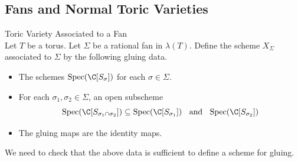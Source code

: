 \documentclass[a4paper]{article}
\begin{document}
\subsection{Fans and Normal Toric Varieties}
\begin{defn}{Toric Variety Associated to a Fan}{}\\
Let $T$ be a torus. Let $\Sigma$ be a rational fan in $\lambda(T)$. Define the scheme $X_\Sigma$ associated to $\Sigma$ by the following gluing data. 
\begin{itemize}
\item The schemes $\text{Spec}(\C[S_\sigma])$ for each $\sigma\in\Sigma$. 
\item For each $\sigma_1,\sigma_2\in\Sigma$, an open subscheme $$\text{Spec}(\C[S_{\sigma_1\cap\sigma_2}])\subseteq\text{Spec}(\C[S_{\sigma_1}])\;\;\text{ and }\;\;\text{Spec}(\C[S_{\sigma_2}])$$
\item The gluing maps are the identity maps. 
\end{itemize}
\end{defn}

We need to check that the above data is sufficient to define a scheme for gluing. 
\end{document}
